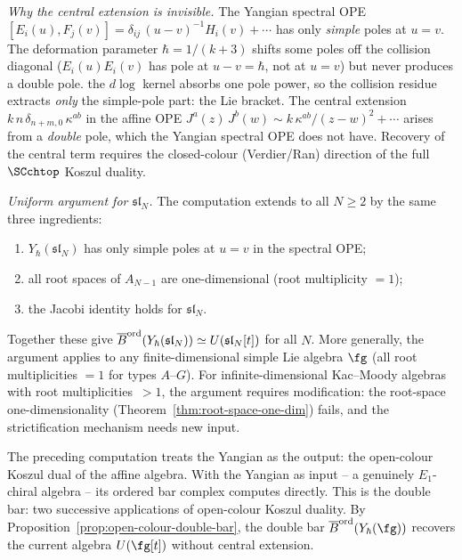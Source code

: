 \begin{computation}
\emph{Why the central extension is invisible.}\enspace
The Yangian spectral OPE
$[E_i(u),F_j(v)]=\delta_{ij}\,(u{-}v)^{-1}H_i(v)+\cdots$
has only \emph{simple} poles at $u=v$. The deformation
parameter $\hbar=1/(k{+}3)$ shifts some poles off the
collision diagonal ($E_i(u)E_i(v)$ has pole at $u{-}v=\hbar$,
not at $u=v$) but never produces a double pole. the $d\!\log$ kernel absorbs one pole power, so the collision
residue extracts \emph{only} the simple-pole part:
the Lie bracket. The central extension
$k\,n\,\delta_{n+m,0}\,\kappa^{ab}$ in the affine OPE
$J^a(z)\,J^b(w)\sim k\,\kappa^{ab}/(z{-}w)^2+\cdots$
arises from a \emph{double} pole, which the Yangian
spectral OPE does not have. Recovery of the central
term requires the closed-colour (Verdier/Ran) direction of
the full $\SCchtop$ Koszul duality.

\emph{Uniform argument for $\mathfrak{sl}_N$.}\enspace
The computation extends to all $N\ge 2$ by the same three
ingredients:
\begin{enumerate}[label=\textup{(\roman*)},nosep]
\item $Y_\hbar(\mathfrak{sl}_N)$ has only simple poles at
$u=v$ in the spectral OPE;
\item all root spaces of $A_{N-1}$ are one-dimensional
(root multiplicity $=1$);
\item the Jacobi identity holds for $\mathfrak{sl}_N$.
\end{enumerate}
Together these give
$\overline{B}^{\mathrm{ord}}(Y_\hbar(\mathfrak{sl}_N))
\simeq U(\mathfrak{sl}_N[t])$ for all $N$.
More generally, the argument applies to any
finite-dimensional simple Lie algebra $\fg$ (all root
multiplicities $=1$ for types $A$--$G$). For
infinite-dimensional Kac--Moody algebras with root
multiplicities~$>1$, the argument requires modification:
the root-space one-dimensionality
(Theorem~\ref{thm:root-space-one-dim}) fails, and the
strictification mechanism needs new input.
\end{computation}

The preceding computation treats the Yangian as the output:
the open-colour Koszul dual of the affine algebra. With the
Yangian as input -- a genuinely $E_1$-chiral algebra -- its
ordered bar complex computes directly. This is the double bar:
two successive applications of open-colour Koszul duality. By
Proposition~\ref{prop:open-colour-double-bar}, the double bar
$\Barchord(Y_\hbar(\fg))$ recovers the current algebra
$U(\fg[t])$ without central extension.

